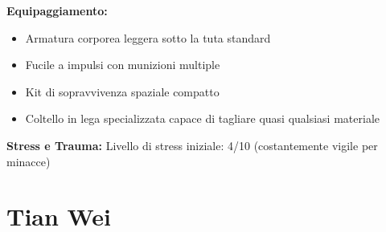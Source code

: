 \documentclass[11pt,a4paper]{article}
\begin{document}
\begin{tcolorbox}[colback=mininglightorange!20, colframe=miningorange]
\textbf{Equipaggiamento:}
\begin{itemize}[leftmargin=*]
\item Armatura corporea leggera sotto la tuta standard
\item Fucile a impulsi con munizioni multiple
\item Kit di sopravvivenza spaziale compatto
\item Coltello in lega specializzata capace di tagliare quasi qualsiasi materiale
\end{itemize}

\textbf{Stress e Trauma:} Livello di stress iniziale: 4/10 (costantemente vigile per minacce)
\end{tcolorbox}



\section{Tian Wei}
\end{document}
